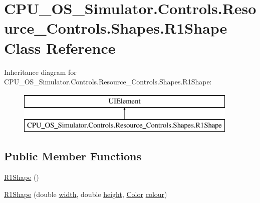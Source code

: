 \hypertarget{class_c_p_u___o_s___simulator_1_1_controls_1_1_resource___controls_1_1_shapes_1_1_r1_shape}{}\section{C\+P\+U\+\_\+\+O\+S\+\_\+\+Simulator.\+Controls.\+Resource\+\_\+\+Controls.\+Shapes.\+R1\+Shape Class Reference}
\label{class_c_p_u___o_s___simulator_1_1_controls_1_1_resource___controls_1_1_shapes_1_1_r1_shape}
Inheritance diagram for C\+P\+U\+\_\+\+O\+S\+\_\+\+Simulator.\+Controls.\+Resource\+\_\+\+Controls.\+Shapes.\+R1\+Shape\+:\begin{figure}[H]
\begin{center}
\leavevmode
\includegraphics[height=2.000000cm]{class_c_p_u___o_s___simulator_1_1_controls_1_1_resource___controls_1_1_shapes_1_1_r1_shape}
\end{center}
\end{figure}
\subsection*{Public Member Functions}
\begin{DoxyCompactItemize}
\item 
\hyperlink{class_c_p_u___o_s___simulator_1_1_controls_1_1_resource___controls_1_1_shapes_1_1_r1_shape_a0153e799f69192b3bc3bf628998a3038}{R1\+Shape} ()
\item 
\hyperlink{class_c_p_u___o_s___simulator_1_1_controls_1_1_resource___controls_1_1_shapes_1_1_r1_shape_a01ab8a79725350d6689d4c1bc10d747b}{R1\+Shape} (double \hyperlink{class_c_p_u___o_s___simulator_1_1_controls_1_1_resource___controls_1_1_shapes_1_1_r1_shape_a8ce2dd23065f10c9f4fe1b642887e7bc}{width}, double \hyperlink{class_c_p_u___o_s___simulator_1_1_controls_1_1_resource___controls_1_1_shapes_1_1_r1_shape_a748f21a84a6c5c28e4e843fd4c1a4012}{height}, \hyperlink{_console_window_8xaml_8cs_adf2800823d988ace598d734fdec29975}{Color} \hyperlink{class_c_p_u___o_s___simulator_1_1_controls_1_1_resource___controls_1_1_shapes_1_1_r1_shape_ab1957c0b4cce1cc178af4994e9faa01a}{colour})
\end{DoxyCompactItemize}
